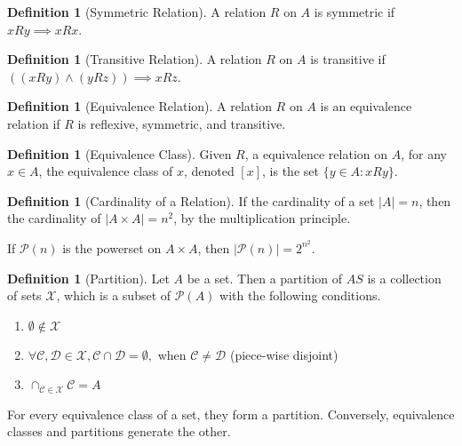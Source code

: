 \documentclass[10pt]{article}
\theoremstyle{definition}
\newtheorem{definition}[equation]{Definition}
\begin{document}
\begin{definition}[Symmetric Relation]
  A relation $R$ on $A$ is symmetric if $xRy\implies xRx$.
\end{definition}

\begin{definition}[Transitive Relation]
  A relation $R$ on $A$ is transitive if $((xRy)\land(yRz))\implies xRz$.
\end{definition}

\begin{definition}[Equivalence Relation]
  A relation $R$ on $A$ is an equivalence relation if $R$ is reflexive, symmetric, and transitive.
\end{definition}

\begin{definition}[Equivalence Class]
  Given $R$, a equivalence relation on $A$, for any $x\in A$, the equivalence class of $x$, denoted $[x]$, is the set $\{y\in A: xRy\}$.
\end{definition}

\begin{definition}[Cardinality of a Relation]
  If the cardinality of a set $|A|=n$, then the cardinality of $|A\times A| = n^2$, by the multiplication principle.

  If $\mathcal{P}(n)$ is the powerset on $A\times A$, then $|\mathcal{P}(n)| = 2^n^2$.
\end{definition}


\begin{definition}[Partition]
  Let $A$ be a set. Then a partition of $AS$ is a collection of sets $\mathcal{X}$, which is a subset of $\mathcal{P}(A)$ with the following conditions.
  \begin{enumerate}
    \item $\emptyset\not\in\mathcal{X}$
    \item $\forall\mathcal{C,D}\in\mathcal{X}, \mathcal{C}\cap\mathcal{D}=\emptyset,$ when $\mathcal{C}\neq\mathcal{D}$ (piece-wise disjoint)
    \item $\cap_{\mathcal{C}\in\mathcal{X}} \mathcal{C} = A$
  \end{enumerate}

  For every equivalence class of a set, they form a partition. Conversely, equivalence classes and partitions generate the other.
\end{definition}
\end{document}
